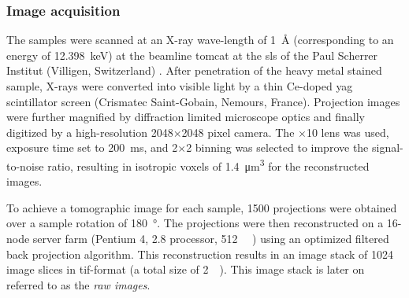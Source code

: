 \subsubsection{Image acquisition}
The samples were scanned at an X-ray wave-length of \SI{1}{\angstrom} (corresponding to an energy of \SI{12.398}{\kilo\electronvolt}) at the beamline \ac{tomcat} at the \acf{sls} of the Paul Scherrer Institut (Villigen, Switzerland) \cite{Stampanoni2002,Stampanoni2007}. After penetration of the heavy metal stained sample, X-rays were converted into visible light by a thin Ce-doped \acs{yag} scintillator screen (Crismatec Saint-Gobain, Nemours, France). Projection images were further magnified by diffraction limited microscope optics and finally digitized by a high-resolution 2048$\times$2048 pixel  camera. The $\times$10 lens was used, exposure time set to \SI{200}{\milli\second}, and 2$\times$2 binning was selected to improve the signal-to-noise ratio, resulting in isotropic voxels of \SI{1.4}{\micro\meter\cubed} for the reconstructed images.

To achieve a tomographic image for each sample, 1500 projections were obtained over a sample rotation of \SI{180}{\degree}. The projections were then reconstructed on a 16-node server farm (Pentium 4, \SI{2.8}{\gigahertz} processor, \SI{512}{\mega\byte} ) using an optimized filtered back projection algorithm. This reconstruction results in an image stack of 1024 image slices in tif-format (a total size of \SI{2}{\giga\byte}). This image stack is later on referred to as the \emph{raw images}.

